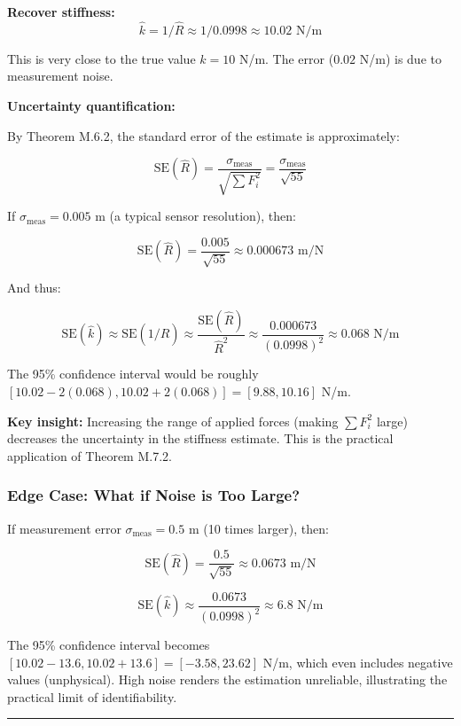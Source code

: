 \documentclass[
]{article}
\begin{document}
\textbf{Recover stiffness:}
\[\widehat{k} = 1/\widehat{R} \approx 1/0.0998 \approx 10.02 \text{ N/m}\]

This is very close to the true value \(k = 10\) N/m. The error (\(0.02\)
N/m) is due to measurement noise.

\textbf{Uncertainty quantification:}

By Theorem M.6.2, the standard error of the estimate is approximately:

\[\text{SE}(\widehat{R}) = \frac{\sigma_{\text{meas}}}{\sqrt{\sum F_i^2}} = \frac{\sigma_{\text{meas}}}{\sqrt{55}}\]

If \(\sigma_{\text{meas}} = 0.005\) m (a typical sensor resolution),
then:

\[\text{SE}(\widehat{R}) = \frac{0.005}{\sqrt{55}} \approx 0.000673 \text{ m/N}\]

And thus:

\[\text{SE}(\widehat{k}) \approx \text{SE}(1/\widehat{R}) \approx \frac{\text{SE}(\widehat{R})}{\widehat{R}^2} \approx \frac{0.000673}{(0.0998)^2} \approx 0.068 \text{ N/m}\]

The 95\% confidence interval would be roughly
\([10.02 - 2(0.068), 10.02 + 2(0.068)] = [9.88, 10.16]\) N/m.

\textbf{Key insight:} Increasing the range of applied forces (making
\(\sum F_i^2\) large) decreases the uncertainty in the stiffness
estimate. This is the practical application of Theorem M.7.2.

\subsubsection{Edge Case: What if Noise is Too
Large?}\label{edge-case-what-if-noise-is-too-large}

If measurement error \(\sigma_{\text{meas}} = 0.5\) m (10 times larger),
then:

\[\text{SE}(\widehat{R}) = \frac{0.5}{\sqrt{55}} \approx 0.0673 \text{ m/N}\]

\[\text{SE}(\widehat{k}) \approx \frac{0.0673}{(0.0998)^2} \approx 6.8 \text{ N/m}\]

The 95\% confidence interval becomes
\([10.02 - 13.6, 10.02 + 13.6] = [-3.58, 23.62]\) N/m, which even
includes negative values (unphysical). High noise renders the estimation
unreliable, illustrating the practical limit of identifiability.

\begin{center}\rule{0.5\linewidth}{0.5pt}\end{center}
\end{document}
